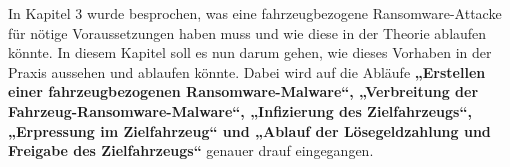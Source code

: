 In Kapitel 3 wurde besprochen, was eine fahrzeugbezogene Ransomware-Attacke 
für nötige Voraussetzungen haben muss und wie diese in der Theorie ablaufen 
könnte. 
In diesem Kapitel soll es nun darum gehen, wie dieses Vorhaben in der Praxis 
aussehen und ablaufen könnte. Dabei wird auf die Abläufe \textbf{„Erstellen einer 
fahrzeugbezogenen Ransomware-Malware“, „Verbreitung der Fahrzeug-Ransomware-Malware“, 
„Infizierung des Zielfahrzeugs“, „Erpressung im Zielfahrzeug“ und „Ablauf der 
Lösegeldzahlung und Freigabe des Zielfahrzeugs“} genauer drauf eingegangen.
